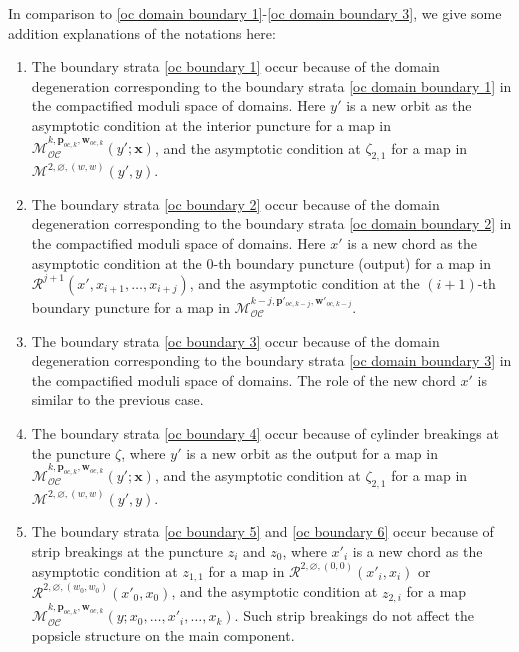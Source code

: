 \documentclass[11pt]{amsproc}
\def\cR{\mathcal{R}}
\def\oc{\mathcal{OC}}
\def\M{\mathcal{M}}
\theoremstyle{remark}
\numberwithin{equation}{section}
\begin{document}
In comparison to \eqref{oc domain boundary 1}-\eqref{oc domain boundary 3},
we give some addition explanations of the notations here:
\begin{enumerate}[label=(\roman*)]

\item The boundary strata \eqref{oc boundary 1} occur because of the domain degeneration corresponding to the boundary strata \eqref{oc domain boundary 1} in the compactified moduli space of domains.
Here $y'$ is a new orbit as the asymptotic condition at the interior puncture for a map in $\M_{\oc}^{k, \mathbf{p}_{oc, k}, \mathbf{w}_{oc, k}}(y'; \mathbf{x})$,
and the asymptotic condition at $\zeta_{2, 1}$ for a map in $\M^{2, \varnothing, (w, w)}(y', y)$.

\item The boundary strata \eqref{oc boundary 2} occur because of the domain degeneration corresponding to the boundary strata \eqref{oc domain boundary 2} in the compactified moduli space of domains.
Here $x'$ is a new chord as the asymptotic condition at the $0$-th boundary puncture (output) for a map in $\cR^{j+1}(x', x_{i+1}, \ldots, x_{i+j})$,
and the asymptotic condition at the $(i+1)$-th boundary puncture for a map in $\M_{\oc}^{k-j, \mathbf{p}'_{oc, k-j}, \mathbf{w}'_{oc, k-j}}$.

\item The boundary strata \eqref{oc boundary 3} occur because of the domain degeneration corresponding to the boundary strata \eqref{oc domain boundary 3} in the compactified moduli space of domains.
The role of the new chord $x'$ is similar to the previous case.

\item The boundary strata \eqref{oc boundary 4} occur because of cylinder breakings at the puncture $\zeta$,
where $y'$ is a new orbit as the output for a map in $\M_{\oc}^{k, \mathbf{p}_{oc, k}, \mathbf{w}_{oc, k}}(y'; \mathbf{x})$,
and the asymptotic condition at $\zeta_{2, 1}$ for a map in $\M^{2, \varnothing, (w, w)}(y', y)$.

\item The boundary strata \eqref{oc boundary 5} and \eqref{oc boundary 6} occur because of strip breakings at the puncture $z_{i}$ and $z_{0}$,
where $x'_{i}$ is a new chord as the asymptotic condition at $z_{1, 1}$ for a map in $\cR^{2, \varnothing, (0, 0)}(x'_{i}, x_{i})$ or $\cR^{2, \varnothing, (w_{0}, w_{0})}(x'_{0}, x_{0})$, 
and the asymptotic condition at $z_{2, i}$ for a map $\M_{\oc}^{k, \mathbf{p}_{oc, k}, \mathbf{w}_{oc, k}}(y; x_{0}, \ldots, x'_{i}, \ldots, x_{k})$.
Such strip breakings do not affect the popsicle structure on the main component.

\end{enumerate}
\end{document}
